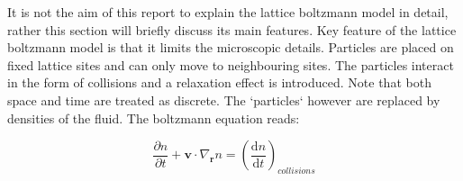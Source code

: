 It is not the aim of this report to explain the lattice boltzmann model in detail, rather this section will briefly discuss its main features. Key feature of the lattice boltzmann model is that it limits the microscopic details. Particles are placed on fixed lattice sites and can only move to neighbouring sites. The particles interact in the form of collisions and a relaxation effect is introduced. Note that both space and time are treated as discrete. The `particles` however are replaced by densities of the fluid. The boltzmann equation reads:

\begin{equation}
    \frac{\partial n}{\partial t} + \mathbf{v} \cdot \nabla_{\mathbf{r}} n = \left( \frac{\mathrm{d}n}{\mathrm{d}t} \right )_{collisions}
\end{equation} 
